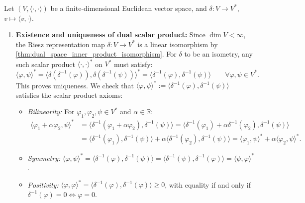 \begin{exercisesolution}
\label{sol:dual_space_inner_product_isometry}
Let $(V, \langle \cdot, \cdot \rangle)$ be a finite-di\-men\-sional Euclidean vector space, and $\delta \colon V \to V^*$, $v \mapsto \langle v, \cdot \rangle$.
\begin{enumerate}[label=\textbf{(\alph*)}]
    \item \textbf{Existence and uniqueness of dual scalar product:}
    Since $\dim V < \infty$, the Riesz representation map $\delta \colon V \to V^*$ is a linear isomorphism by \cref{thm:dual_space_inner_product_isomorphism}.
    For $\delta$ to be an isometry, any such scalar product $\langle \cdot, \cdot \rangle^*$ on $V^*$ must satisfy:
    \[
    \langle \varphi, \psi \rangle^* = \langle \delta(\delta^{-1}(\varphi)), \delta(\delta^{-1}(\psi)) \rangle^* = \langle \delta^{-1}(\varphi), \delta^{-1}(\psi) \rangle \qquad \forall \varphi, \psi \in V^*.
    \]
    This proves uniqueness. We check that $\langle \varphi, \psi \rangle^* := \langle \delta^{-1}(\varphi), \delta^{-1}(\psi) \rangle$ satisfies the scalar product axioms:
    \begin{itemize}
        \item \emph{Bilinearity:} For $\varphi_1, \varphi_2, \psi \in V^*$ and $\alpha \in \mathbb{R}$:
        \begin{align*}
        \langle \varphi_1 + \alpha \varphi_2, \psi \rangle^* &= \langle \delta^{-1}(\varphi_1 + \alpha \varphi_2), \delta^{-1}(\psi) \rangle = \langle \delta^{-1}(\varphi_1) + \alpha \delta^{-1}(\varphi_2), \delta^{-1}(\psi) \rangle \\
        &= \langle \delta^{-1}(\varphi_1), \delta^{-1}(\psi) \rangle + \alpha \langle \delta^{-1}(\varphi_2), \delta^{-1}(\psi) \rangle = \langle \varphi_1, \psi \rangle^* + \alpha \langle \varphi_2, \psi \rangle^*.
        \end{align*}
        \item \emph{Symmetry:} $\langle \varphi, \psi \rangle^* = \langle \delta^{-1}(\varphi), \delta^{-1}(\psi) \rangle = \langle \delta^{-1}(\psi), \delta^{-1}(\varphi) \rangle = \langle \psi, \varphi \rangle^*$.
        \item \emph{Positivity:} $\langle \varphi, \varphi \rangle^* = \langle \delta^{-1}(\varphi), \delta^{-1}(\varphi) \rangle \ge 0$, with equality if and only if $\delta^{-1}(\varphi) = 0 \iff \varphi = 0$.
    \end{itemize}


\end{enumerate}
\end{exercisesolution}
